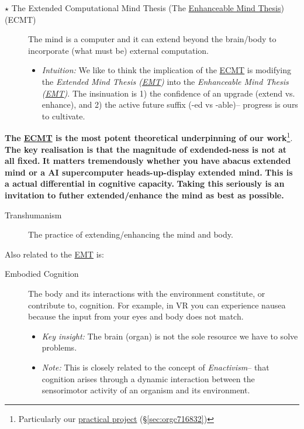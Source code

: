 \documentclass[logo,bsc,singlespacing,parskip]{infthesis}
\begin{document}
{\begin{mdframed}
\begin{description}
\item[{\(\star\) The Extended Computational Mind Thesis (The \hyperref[org7d3a30b]{Enhanceable Mind Thesis}) (\label{orgbff3db9}ECMT)}] The mind is a computer and it can extend beyond the brain/body to incorporate (what must be) external computation.
\begin{itemize}
\item \emph{Intuition:} We like to think the implication of the \hyperref[orgbff3db9]{ECMT} is modifying the \emph{Extended Mind Thesis (\hyperref[org6a0a28b]{EMT})} into the \emph{\label{org7d3a30b}Enhanceable Mind Thesis (\hyperref[org6a0a28b]{EMT})}.
The insinuation is 1) the confidence of an upgrade (extend vs. enhance), and 2) the active future suffix (-ed vs -able)-- progress is ours to cultivate.
\end{itemize}
\end{description}
\end{mdframed}

\textbf{The \hyperref[orgbff3db9]{ECMT} is the most potent theoretical underpinning of our work}\footnote{Particularly our \hyperref[sec:orgc716832]{practical project} (\S \ref{sec:orgc716832})}.
\textbf{The key realisation is that the magnitude of exdended-ness is not at all fixed.}
\textbf{It matters tremendously whether you have abacus extended mind or a AI supercomputer heads-up-display extended mind.}
\textbf{This is a actual differential in cognitive capacity.}
\textbf{Taking this seriously is an invitation to futher extended/enhance the mind as best as possible.}

\begin{mdframed}
\begin{description}
\item[{\label{org152cfbd}Transhumanism}] The practice of extending/enhancing the mind and body.
\end{description}
\end{mdframed}

Also related to the \hyperref[org6a0a28b]{EMT} is:

\begin{mdframed}
\begin{description}
\item[{\label{org80caeb7}Embodied Cognition}] The body and its interactions with the environment constitute, or contribute to, cognition.
For example, in VR you can experience nausea because the input from your eyes and body does not match.
\begin{itemize}
\item \emph{Key insight:} The brain (organ) is not the sole resource we have to solve problems.
\item \emph{Note:} This is closely related to the concept of \emph{Enactivism}-- that cognition arises through a dynamic interaction between the sensorimotor activity of an organism and its environment.
\end{itemize}
\end{description}
\end{mdframed}

}
\end{document}
